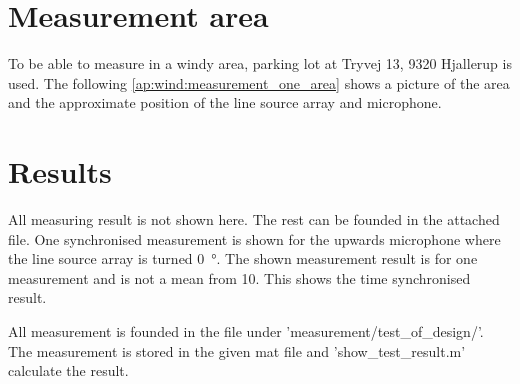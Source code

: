 \section*{Measurement area}
To be able to measure in a windy area, parking lot at Tryvej 13, 9320 Hjallerup is used. The following \autoref{ap:wind:measurement_one_area} shows a picture of the area and the approximate position of the line source array and microphone.


\section*{Results}

All measuring result is not shown here. The rest can be founded in the attached file. One synchronised measurement is shown for the upwards microphone where the line source array is turned \SI{0}{\degree}. The shown measurement result is for one measurement and is not a mean from 10. This shows the time synchronised result. 






All measurement is founded in the file under 'measurement/test_of_design/'. The measurement is stored in the given mat file and 'show_test_result.m' calculate the result.



